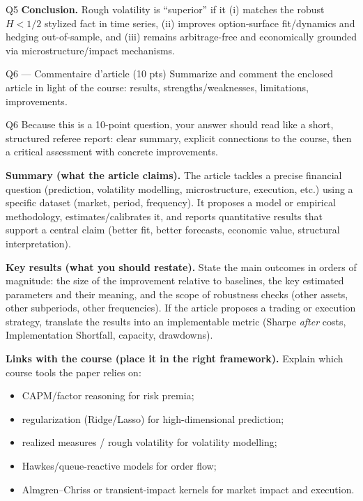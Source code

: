 \begin{solutionbox}{Q5}
\medskip
\textbf{Conclusion.} Rough volatility is ``superior'' if it (i) matches the robust \(H<1/2\) stylized fact in time series, (ii) improves option-surface fit/dynamics and hedging out-of-sample, and (iii) remains arbitrage-free and economically grounded via microstructure/impact mechanisms.
\end{solutionbox}

\begin{questionbox}{Q6 --- Commentaire d'article (10 pts)}
Summarize and comment the enclosed article in light of the course: results, strengths/weaknesses, limitations, improvements.
\end{questionbox}

\begin{solutionbox}{Q6}
Because this is a 10-point question, your answer should read like a short, structured referee report: clear summary, explicit connections to the course, then a critical assessment with concrete improvements.

\medskip
\textbf{Summary (what the article claims).} The article tackles a precise financial question (prediction, volatility modelling, microstructure, execution, etc.) using a specific dataset (market, period, frequency). It proposes a model or empirical methodology, estimates/calibrates it, and reports quantitative results that support a central claim (better fit, better forecasts, economic value, structural interpretation).

\medskip
\textbf{Key results (what you should restate).} State the main outcomes in orders of magnitude: the size of the improvement relative to baselines, the key estimated parameters and their meaning, and the scope of robustness checks (other assets, other subperiods, other frequencies). If the article proposes a trading or execution strategy, translate the results into an implementable metric (Sharpe \emph{after} costs, Implementation Shortfall, capacity, drawdowns).

\medskip
\textbf{Links with the course (place it in the right framework).} Explain which course tools the paper relies on:
\begin{itemize}[leftmargin=*]
  \item CAPM/factor reasoning for risk premia;
  \item regularization (Ridge/Lasso) for high-dimensional prediction;
  \item realized measures / rough volatility for volatility modelling;
  \item Hawkes/queue-reactive models for order flow;
  \item Almgren--Chriss or transient-impact kernels for market impact and execution.
\end{itemize}


\end{solutionbox}

